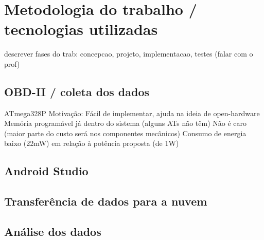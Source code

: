 \chapter{Metodologia do trabalho / tecnologias utilizadas}
\label{CAP3}


descrever fases do trab: concepcao, projeto, implementacao, testes
(falar com o prof)


\section{OBD-II / coleta dos dados}
ATmega328P
Motivação:
Fácil de implementar, ajuda na ideia de open-hardware
Memória programável já dentro do sistema (alguns ATs não têm)
Não é caro (maior parte do custo será nos componentes mecânicos)
Consumo de energia baixo (22mW) em relação à potência proposta (de 1W)


\section{Android Studio}

\section{Transferência de dados para a nuvem}

\section{Análise dos dados}